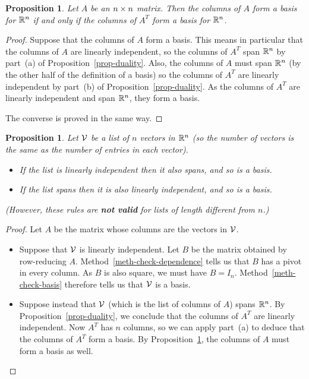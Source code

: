\documentclass[reqno]{amsart}
\newtheorem{proposition}[theorem]{Proposition}
\theoremstyle{definition}
\begin{document}
\begin{proposition}\label{prop-duality-bases}
 Let $A$ be an $n\times n$ matrix.  Then the columns of $A$ form a basis
 for ${\mathbb{R}}^n$ if and only if the columns of $A^T$ form a basis for
 ${\mathbb{R}}^n$.
\end{proposition}
\begin{proof}
 Suppose that the columns of $A$ form a basis.  This means in
 particular that the columns of $A$ are linearly independent, so the
 columns of $A^T$ span ${\mathbb{R}}^n$ by part~(a) of
 Proposition~\ref{prop-duality}.  Also, the columns of $A$ must span
 ${\mathbb{R}}^n$ (by the other half of the definition of a basis) so the
 columns of $A^T$ are linearly independent by part~(b) of
 Proposition~\ref{prop-duality}.  As the columns of $A^T$ are linearly
 independent and span ${\mathbb{R}}^n$, they form a basis.

 The converse is proved in the same way.
\end{proof}

\begin{proposition}\label{prop-basis-numerical}
 Let $\mathcal{V}$ be a list of $n$ vectors in ${\mathbb{R}}^n$ (so the number of
 vectors is the same as the number of entries in each vector).
 \begin{itemize}
  \item[(a)] If the list is linearly independent then it also spans,
   and so is a basis.
  \item[(b)] If the list spans then it is also linearly independent,
   and so is a basis.
 \end{itemize}
 (However, these rules are \textbf{not valid} for lists of length
 different from $n$.)
\end{proposition}
\begin{proof}
 Let $A$ be the matrix whose columns are the vectors in $\mathcal{V}$.
 \begin{itemize}
 \item[(a)] Suppose that $\mathcal{V}$ is linearly independent.  Let $B$ be
  the matrix obtained by row-reducing $A$.
  Method~\ref{meth-check-dependence} tells us that $B$ has a pivot in
  every column.  As $B$ is also square, we must have $B=I_n$.
  Method~\ref{meth-check-basis} therefore tells us that $\mathcal{V}$ is a
  basis.
 \item[(b)] Suppose instead that $\mathcal{V}$ (which is the list of columns
  of $A$) spans ${\mathbb{R}}^n$.  By Proposition~\ref{prop-duality}, we
  conclude that the columns of $A^T$ are linearly independent.  Now
  $A^T$ has $n$ columns, so we can apply part~(a) to deduce that the
  columns of $A^T$ form a basis.  By
  Proposition~\ref{prop-duality-bases}, the columns of $A$ must form a
  basis as well.
  \qedhere
 \end{itemize}
\end{proof}
\end{document}
